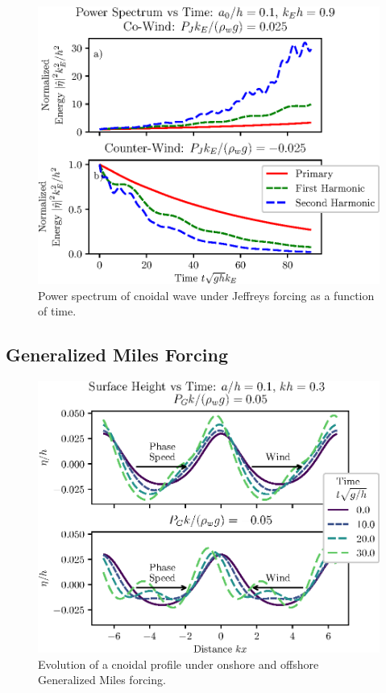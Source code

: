\documentclass{jfm}
\begin{document}
\begin{figure}
  \centering
  \includegraphics{Power-Spectrum-vs-Time-Jeffreys.eps}
  \caption{
    Power spectrum of cnoidal wave under Jeffreys forcing as a function
    of time.
  }
\end{figure}

\subsection{Generalized Miles Forcing}

\begin{figure}
  \centering
  \includegraphics{Snapshots-Positive-Negative-Cnoidal-GM.eps}
  \caption{
    Evolution of a cnoidal profile under onshore and offshore Generalized
    Miles forcing.
  }
\end{figure}
\end{document}
